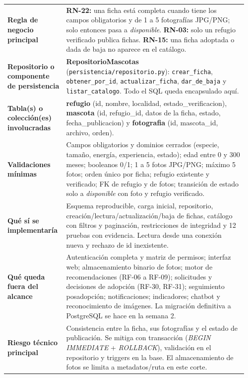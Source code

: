 \documentclass[11pt,a4paper]{article}
\newcommand{\code}[1]{\texttt{#1}}
\begin{document}
{\begin{longtable}{@{}A{0.225\linewidth}L{0.735\linewidth}@{}}
\textbf{Regla de negocio principal} &
\textbf{RN-22:} una ficha está completa cuando tiene los campos obligatorios y
de 1 a 5 fotografías JPG/PNG; solo entonces pasa a \emph{disponible}.
\textbf{RN-03:} solo un refugio verificado publica fichas.
\textbf{RN-15:} una ficha adoptada o dada de baja no aparece en el catálogo. \\

\textbf{Repositorio o componente de persistencia} &
\textbf{RepositorioMascotas} (\code{persistencia/repositorio.py}):
\code{crear\_ficha}, \code{obtener\_por\_id}, \code{actualizar\_ficha},
\code{dar\_de\_baja} y \code{listar\_catalogo}. Todo el SQL queda encapsulado aquí. \\

\textbf{Tabla(s) o colección(es) involucradas} &
\textbf{refugio} (id, nombre, localidad, estado\_verificacion),
\textbf{mascota} (id, refugio\_id, datos de la ficha, estado, fecha\_publicacion) y
\textbf{fotografia} (id, mascota\_id, archivo, orden). \\

\textbf{Validaciones mínimas} &
Campos obligatorios y dominios cerrados (especie, tamaño, energía, experiencia, estado);
edad entre 0 y 300 meses; booleanos 0/1; 1 a 5 fotos JPG/PNG; máximo 5 fotos; orden único
por ficha; refugio existente y verificado; FK de refugio y de fotos; transición de estado
solo a \emph{disponible} con foto y refugio verificado. \\

\textbf{Qué sí se implementaría} &
Esquema reproducible, carga inicial, repositorio, creación/lectura/actualización/baja de
fichas, catálogo con filtros y paginación, restricciones de integridad y 12 pruebas con
evidencia. Lectura desde una conexión nueva y rechazo de id inexistente. \\

\textbf{Qué queda fuera del alcance} &
Autenticación completa y matriz de permisos; interfaz web; almacenamiento binario de fotos;
motor de recomendaciones (RF-06 a RF-09); solicitudes y decisiones de adopción (RF-30,
RF-31); seguimiento posadopción; notificaciones; indicadores; chatbot y reconocimiento de
imágenes. La migración definitiva a PostgreSQL se hace en la semana 2. \\

\textbf{Riesgo técnico principal} &
Consistencia entre la ficha, sus fotografías y el estado de publicación. Se mitiga con
transacción (\emph{BEGIN IMMEDIATE} + \emph{ROLLBACK}), validación en el repositorio y
triggers en la base. El almacenamiento de fotos se limita a metadatos/ruta en este corte. \\
\end{longtable}
}
\end{document}
